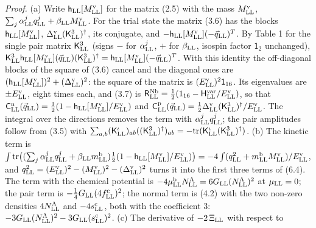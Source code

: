 \documentclass[
  10pt,
]{article}
\begin{document}
\emph{Proof.} (a) Write \(\mathsf h_{\rm LL}[M^{\rm v}_{\rm LL}]\) for
the matrix (2.5) with the mass \(M^{\rm v}_{\rm LL}\),
\(\sum_j\alpha^j_{\rm LL}q^j_{\rm LL}+\beta_{\rm LL}M^{\rm v}_{\rm LL}\).
For the trial state the matrix (3.6) has the blocks
\(\mathsf h_{\rm LL}[M^{\rm v}_{\rm LL}]\),
\(\Delta^{\rm v}_{\rm LL}(\mathsf K^3_{\rm LL})^\dagger\), its
conjugate, and
\(-\mathsf h_{\rm LL}[M^{\rm v}_{\rm LL}](-\vec q_{\rm LL})^T\). By
Table 1 for the single pair matrix \(\mathsf K^3_{\rm LL}\) (signs \(-\)
for \(\alpha^j_{\rm LL}\), \(+\) for \(\beta_{\rm LL}\), isospin factor
\(\mathsf 1_2\) unchanged),
\(\mathsf K^3_{\rm LL}\mathsf h_{\rm LL}[M^{\rm v}_{\rm LL}](\vec q_{\rm LL})(\mathsf K^3_{\rm LL})^\dagger=\mathsf h_{\rm LL}[M^{\rm v}_{\rm LL}](-\vec q_{\rm LL})^T\).
With this identity the off-diagonal blocks of the square of (3.6) cancel
and the diagonal ones are
\((\mathsf h_{\rm LL}[M^{\rm v}_{\rm LL}])^2+(\Delta^{\rm v}_{\rm LL})^2\):
the square of the matrix is \((E^{\rm v}_{\rm LL})^2\mathsf 1_{16}\).
Its eigenvalues are \(\pm E^{\rm v}_{\rm LL}\), eight times each, and
(3.7) is
\(\mathsf R^{\rm Nb}_{\rm LL}=\tfrac12(\mathsf 1_{16}-\mathsf H^{\rm var}_{\rm LL}/E^{\rm v}_{\rm LL})\),
so that
\(\mathsf C^{\rm n}_{\rm LL}(\vec q_{\rm LL})=\tfrac12(1-\mathsf h_{\rm LL}[M^{\rm v}_{\rm LL}]/E^{\rm v}_{\rm LL})\)
and
\(\mathsf C^{\rm p}_{\rm LL}(\vec q_{\rm LL})=\tfrac12\Delta^{\rm v}_{\rm LL}(\mathsf K^3_{\rm LL})^\dagger/E^{\rm v}_{\rm LL}\).
The integral over the directions removes the term with
\(\alpha^j_{\rm LL}q^j_{\rm LL}\); the pair amplitudes follow from (3.5)
with
\(\sum_{a,b}(\mathsf K^\iota_{\rm LL})_{ab}((\mathsf K^3_{\rm LL})^\dagger)_{ab}=-\mathrm{tr}(\mathsf K^\iota_{\rm LL}(\mathsf K^3_{\rm LL})^\dagger)\).
(b) The kinetic term is
\(\int\mathrm{tr}\big((\sum_j\alpha^j_{\rm LL}q^j_{\rm LL}+\beta_{\rm LL}m^{\rm b}_{\rm LL})\tfrac12(1-\mathsf h_{\rm LL}[M^{\rm v}_{\rm LL}]/E^{\rm v}_{\rm LL})\big) =-4\int(q_{\rm LL}^2+m^{\rm b}_{\rm LL}M^{\rm v}_{\rm LL})/E^{\rm v}_{\rm LL}\),
and
\(q_{\rm LL}^2=(E^{\rm v}_{\rm LL})^2-(M^{\rm v}_{\rm LL})^2-(\Delta^{\rm v}_{\rm LL})^2\)
turns it into the first three terms of (6.4). The term with the chemical
potential is
\(-4\mu^{\rm b}_{\rm LL}N^\Lambda_{\rm LL}=6G_{\rm LL}(N^\Lambda_{\rm LL})^2\)
at \(\mu_{\rm LL}=0\); the pair term is
\(-\tfrac14G_{\rm LL}(4f^{\rm c}_{\rm LL})^2\); the normal term is (4.2)
with the two non-zero densities \(4N^\Lambda_{\rm LL}\) and
\(-4s^{\rm c}_{\rm LL}\), both with the coefficient 3:
\(-3G_{\rm LL}(N^\Lambda_{\rm LL})^2-3G_{\rm LL}(s^{\rm c}_{\rm LL})^2\).
(c) The derivative of \(-2\,\Xi_{\rm LL}\) with respect to
\end{document}
